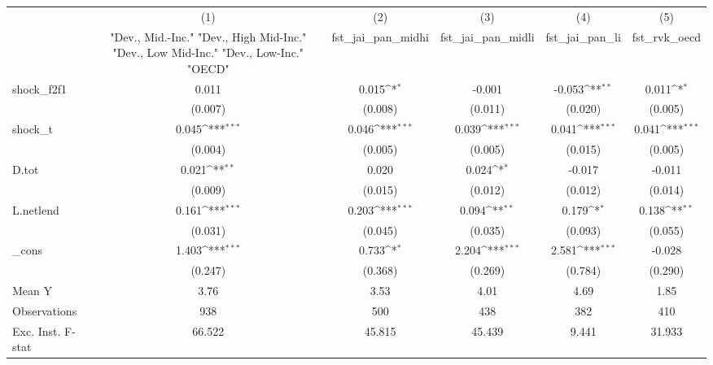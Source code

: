 {
\def\sym#1{\ifmmode^{#1}\else\(^{#1}\)\fi}
\begin{tabular}{l*{5}{c}}
\toprule
            &\multicolumn{1}{c}{(1)}&\multicolumn{1}{c}{(2)}&\multicolumn{1}{c}{(3)}&\multicolumn{1}{c}{(4)}&\multicolumn{1}{c}{(5)}\\
            &\multicolumn{1}{c}{ "Dev., Mid.-Inc." "Dev., High Mid-Inc." "Dev., Low Mid-Inc." "Dev., Low-Inc." "OECD" }&\multicolumn{1}{c}{fst\_jai\_pan\_midhi}&\multicolumn{1}{c}{fst\_jai\_pan\_midli}&\multicolumn{1}{c}{fst\_jai\_pan\_li}&\multicolumn{1}{c}{fst\_rvk\_oecd}\\
\midrule
shock\_f2f1  &       0.011         &       0.015\sym{*}  &      -0.001         &      -0.053\sym{**} &       0.011\sym{*}  \\
            &     (0.007)         &     (0.008)         &     (0.011)         &     (0.020)         &     (0.005)         \\
\addlinespace
shock\_t     &       0.045\sym{***}&       0.046\sym{***}&       0.039\sym{***}&       0.041\sym{***}&       0.041\sym{***}\\
            &     (0.004)         &     (0.005)         &     (0.005)         &     (0.015)         &     (0.005)         \\
\addlinespace
D.tot       &       0.021\sym{**} &       0.020         &       0.024\sym{*}  &      -0.017         &      -0.011         \\
            &     (0.009)         &     (0.015)         &     (0.012)         &     (0.012)         &     (0.014)         \\
\addlinespace
L.netlend   &       0.161\sym{***}&       0.203\sym{***}&       0.094\sym{**} &       0.179\sym{*}  &       0.138\sym{**} \\
            &     (0.031)         &     (0.045)         &     (0.035)         &     (0.093)         &     (0.055)         \\
\addlinespace
\_cons      &       1.403\sym{***}&       0.733\sym{*}  &       2.204\sym{***}&       2.581\sym{***}&      -0.028         \\
            &     (0.247)         &     (0.368)         &     (0.269)         &     (0.784)         &     (0.290)         \\
\midrule
Mean Y      &        3.76         &        3.53         &        4.01         &        4.69         &        1.85         \\
Observations&         938         &         500         &         438         &         382         &         410         \\
Exc. Inst. F-stat&      66.522         &      45.815         &      45.439         &       9.441         &      31.933         \\
\bottomrule
\end{tabular}
}
